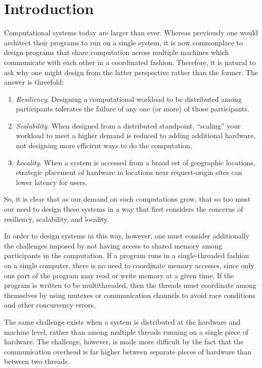 \chapter{Introduction}

Computational systems today are larger than ever. Whereas previously one would
architect their programs to run on a single system, it is now commonplace to
design programs that share computation across multiple machines which
communicate with each other in a coordinated fashion. Therefore, it is natural
to ask why one might design from the latter perspective rather than the former.
The answer is threefold:
\begin{enumerate}
  \item \emph{Resiliency}. Designing a computational workload to be distributed
    among participants tolerates the failure of any one (or more) of those
    participants.
  \item \emph{Scalability}. When designed from a distributed standpoint,
    ``scaling'' your workload to meet a higher demand is reduced to adding
    additional hardware, not designing more efficient ways to do the
    computation.
  \item \emph{Locality}. When a system is accessed from a broad set of
    geographic locations, strategic placement of hardware in locations near
    request-origin sites can lower latency for users.
\end{enumerate}

So, it is clear that as our demand on such computations grow, that so too
must our need to design these systems in a way that first considers the concerns
of resiliency, scalability, and locality.

In order to design systems in this way, however, one must consider additionally
the challenges imposed by not having access to shared memory among participants
in the computation. If a program runs in a single-threaded fashion on a single
computer, there is no need to coordinate memory accesses, since only one part of
the program may read or write memory at a given time. If the program is written
to be multithreaded, then the threads must coordinate among themselves by using
mutexes or communication channels to avoid race conditions and other concurrency
errors.

The same challenge exists when a system is distributed at the hardware and
machine level, rather than among multiple threads running on a single piece of
hardware. The challenge, however, is made more difficult by the fact that the
communication overhead is far higher between separate pieces of hardware than
between two threads.

